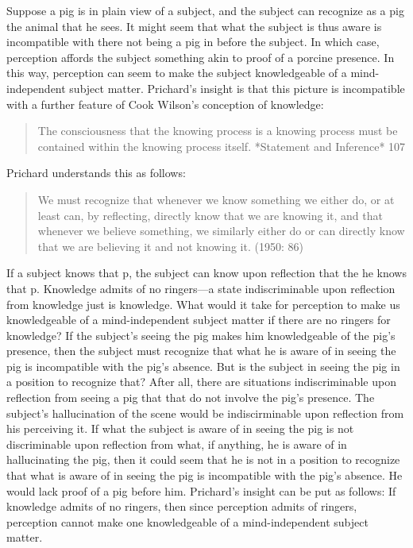 \documentclass[11pt]{article}
\begin{document}
Suppose a pig is in plain view of a subject, and the subject can recognize as a pig the animal that he sees. It might seem that what the subject is thus aware is incompatible with there not being a pig in before the subject. In which case, perception affords the subject something akin to proof of a porcine presence. In this way, perception can seem to make the subject knowledgeable of a mind-independent subject matter. Prichard's insight is that this picture is incompatible with a further feature of Cook Wilson's conception of knowledge:
\begin{quote}
	The consciousness that the knowing process is a knowing process must be contained within the knowing process itself. *Statement and Inference* 107
\end{quote}
Prichard understands this as follows:
\begin{quote}
	We must recognize that whenever we know something we either do, or at least can, by reflecting, directly know that we are knowing it, and that whenever we believe something, we similarly either do or can directly know that we are believing it and not knowing it. (1950: 86)
\end{quote}
If a subject knows that p, the subject can know upon reflection that the he knows that p. Knowledge admits of no ringers---a state indiscriminable upon reflection from knowledge just is knowledge. What would it take for perception to make us knowledgeable of a mind-independent subject matter if there are no ringers for knowledge? If the subject's seeing the pig makes him knowledgeable of the pig's presence, then the subject must recognize that what he is aware of in seeing the pig is incompatible with the pig's absence. But is the subject in seeing the pig in a position to recognize that? After all, there are situations indiscriminable upon reflection from seeing a pig that that do not involve the pig's presence. The subject's hallucination of the scene would be indiscirminable upon reflection from his perceiving it. If what the subject is aware of in seeing the pig is not discriminable upon reflection from what, if anything, he is aware of in hallucinating the pig, then it could seem that he is not in a position to recognize that what is aware of in seeing the pig is incompatible with the pig's absence. He would lack proof of a pig before him. Prichard's insight can be put as follows: If knowledge admits of no ringers, then since perception admits of ringers, perception cannot make one knowledgeable of a mind-independent subject matter.
\end{document}
